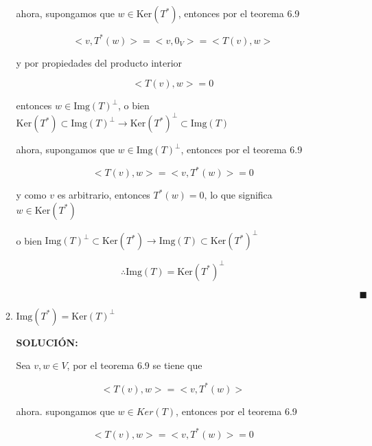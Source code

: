 \documentclass[12pt,a4paper]{article}
\begin{document}
\begin{enumerate}
\begin{enumerate}
        ahora, supongamos que $w \in \text{Ker}(T^{*})$, entonces por el teorema 6.9
        
        \begin{equation*}
            <v,T^{*}(w)> =<v,0_V>=<T(v),w>
        \end{equation*}
        
        y por propiedades del producto interior
        
        \begin{equation*}
            <T(v),w> = 0
        \end{equation*}
        
        entonces $w \in \text{Img}(T)^{\bot}$, o bien $\text{Ker}(T^{*}) \subset \text{Img}(T)^{\bot} \rightarrow \text{Ker}(T^{*})^{\bot} \subset \text{Img}(T)$
        
        ahora, supongamos que $w \in \text{Img}(T)^{\bot}$, entonces por el teorema 6.9
        
        \begin{equation*}
            <T(v),w> = <v,T^{*}(w)>= 0
        \end{equation*}
        
        y como $v$ es arbitrario, entonces $T^{*}(w) = 0$, lo que significa $w \in \text{Ker}(T^{*})$
        
        o bien $\text{Img}(T)^{\bot} \subset \text{Ker}(T^{*}) \rightarrow \text{Img}(T) \subset \text{Ker}(T^{*})^{\bot}$
        
        \begin{equation*}
            \therefore \text{Img}(T) = \text{Ker}(T^{*})^{\bot}
        \end{equation*}
        
        $\hspace{15cm} \blacksquare$
        
        \item $\text{Img} (T^{*}) = \text{Ker}(T)^{\bot}$
        
        \textbf{SOLUCIÓN:}
        
        Sea $v,w \in V$, por el teorema 6.9 se tiene que
        
        \begin{equation*}
            <T(v), w> = <v, T^{*}(w)>
        \end{equation*}
        
        ahora. supongamos que $w \in Ker (T)$, entonces por el teorema 6.9
        
        \begin{equation*}
            <T(v),w> = <v,T^{*}(w)> = 0
        \end{equation*}
        

\end{enumerate}
\end{enumerate}
\end{document}
